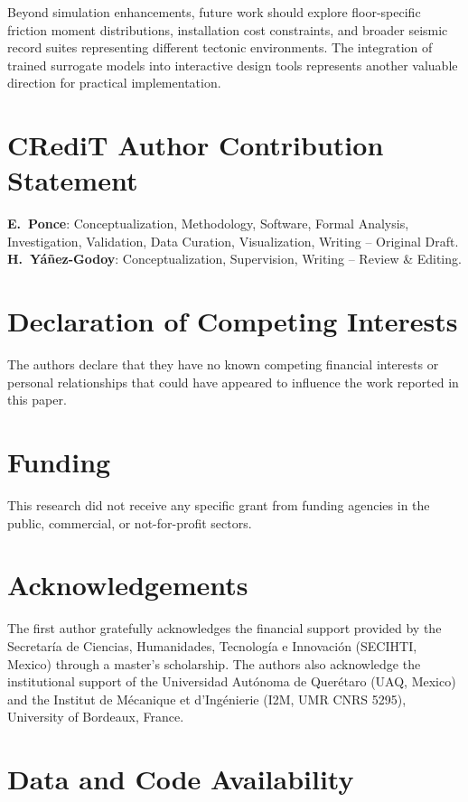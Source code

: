 \documentclass[preprint,12pt,authoryear]{elsarticle}
\begin{document}
Beyond simulation enhancements, future work should explore floor-specific friction moment distributions, installation cost constraints, and broader seismic record suites representing different tectonic environments. The integration of trained surrogate models into interactive design tools represents another valuable direction for practical implementation.

\section*{CRediT Author Contribution Statement}

\textbf{E.~Ponce}: Conceptualization, Methodology, Software, Formal Analysis,
Investigation, Validation, Data Curation, Visualization, Writing -- Original Draft.
\textbf{H.~Yáñez-Godoy}: Conceptualization, Supervision, Writing -- Review \& Editing.

\section*{Declaration of Competing Interests}

The authors declare that they have no known competing financial interests or
personal relationships that could have appeared to influence the work reported
in this paper.

\section*{Funding}

This research did not receive any specific grant from funding agencies in the
public, commercial, or not-for-profit sectors.

\section*{Acknowledgements}

The first author gratefully acknowledges the financial support provided by the
Secretaría de Ciencias, Humanidades, Tecnología e Innovación (SECIHTI, Mexico)
through a master's scholarship. The authors also acknowledge the institutional
support of the Universidad Autónoma de Querétaro (UAQ, Mexico) and the Institut
de Mécanique et d'Ingénierie (I2M, UMR CNRS 5295), University of Bordeaux,
France.

\section*{Data and Code Availability}
\end{document}
